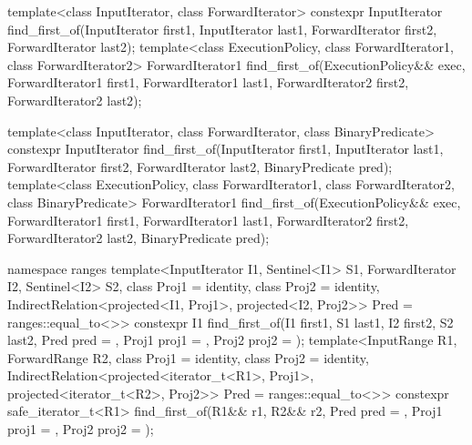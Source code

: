 %
\begin{itemdecl}
template<class InputIterator, class ForwardIterator>
  constexpr InputIterator
    find_first_of(InputIterator first1, InputIterator last1,
                  ForwardIterator first2, ForwardIterator last2);
template<class ExecutionPolicy, class ForwardIterator1, class ForwardIterator2>
  ForwardIterator1
    find_first_of(ExecutionPolicy&& exec,
                  ForwardIterator1 first1, ForwardIterator1 last1,
                  ForwardIterator2 first2, ForwardIterator2 last2);

template<class InputIterator, class ForwardIterator,
         class BinaryPredicate>
  constexpr InputIterator
    find_first_of(InputIterator first1, InputIterator last1,
                  ForwardIterator first2, ForwardIterator last2,
                  BinaryPredicate pred);
template<class ExecutionPolicy, class ForwardIterator1, class ForwardIterator2,
         class BinaryPredicate>
  ForwardIterator1
    find_first_of(ExecutionPolicy&& exec,
                  ForwardIterator1 first1, ForwardIterator1 last1,
                  ForwardIterator2 first2, ForwardIterator2 last2,
                  BinaryPredicate pred);

namespace ranges {
  template<InputIterator I1, Sentinel<I1> S1, ForwardIterator I2, Sentinel<I2> S2,
      class Proj1 = identity, class Proj2 = identity,
      IndirectRelation<projected<I1, Proj1>, projected<I2, Proj2>> Pred = ranges::equal_to<>>
    constexpr I1 find_first_of(I1 first1, S1 last1, I2 first2, S2 last2,
                                Pred pred = {},
                                Proj1 proj1 = {}, Proj2 proj2 = {});
  template<InputRange R1, ForwardRange R2, class Proj1 = identity,
      class Proj2 = identity,
      IndirectRelation<projected<iterator_t<R1>, Proj1>,
        projected<iterator_t<R2>, Proj2>> Pred = ranges::equal_to<>>
    constexpr safe_iterator_t<R1>
      find_first_of(R1&& r1, R2&& r2,
                    Pred pred = {},
                    Proj1 proj1 = {}, Proj2 proj2 = {});
}
\end{itemdecl}

